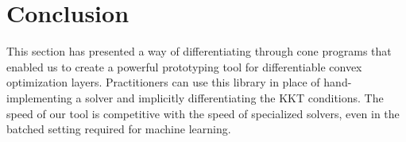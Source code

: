 \section{Conclusion}
This section has presented a way of differentiating through
cone programs that enabled us to create a powerful prototyping
tool for differentiable convex optimization layers.
Practitioners can use this library in place of hand-implementing
a solver and implicitly differentiating the KKT conditions.
The speed of our tool is competitive with the speed of specialized
solvers, even in the batched setting required for machine learning.

